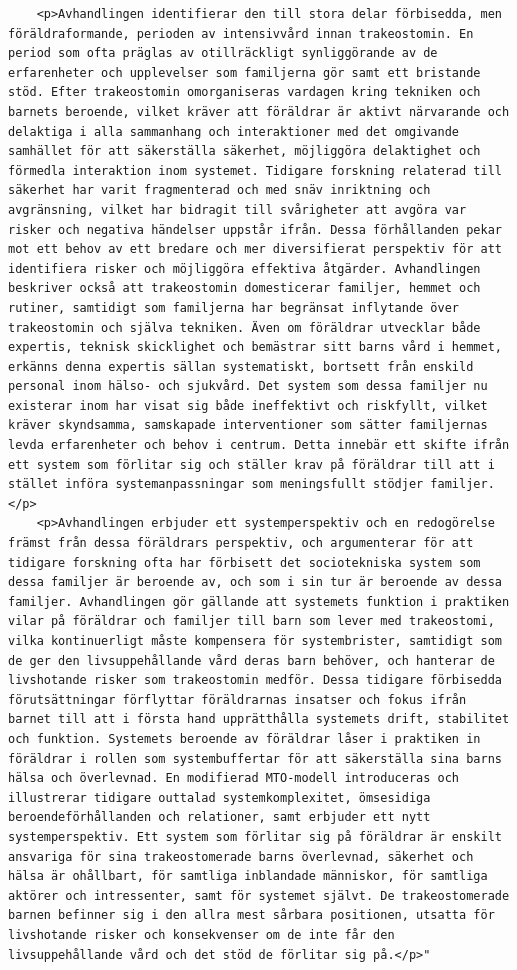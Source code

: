 \begin{casestudySection}
\begin{lstlisting}
    <p>Avhandlingen identifierar den till stora delar förbisedda, men föräldraformande, perioden av intensivvård innan trakeostomin. En period som ofta präglas av otillräckligt synliggörande av de erfarenheter och upplevelser som familjerna gör samt ett bristande stöd. Efter trakeostomin omorganiseras vardagen kring tekniken och barnets beroende, vilket kräver att föräldrar är aktivt närvarande och delaktiga i alla sammanhang och interaktioner med det omgivande samhället för att säkerställa säkerhet, möjliggöra delaktighet och förmedla interaktion inom systemet. Tidigare forskning relaterad till säkerhet har varit fragmenterad och med snäv inriktning och avgränsning, vilket har bidragit till svårigheter att avgöra var risker och negativa händelser uppstår ifrån. Dessa förhållanden pekar mot ett behov av ett bredare och mer diversifierat perspektiv för att identifiera risker och möjliggöra effektiva åtgärder. Avhandlingen beskriver också att trakeostomin domesticerar familjer, hemmet och rutiner, samtidigt som familjerna har begränsat inflytande över trakeostomin och själva tekniken. Även om föräldrar utvecklar både expertis, teknisk skicklighet och bemästrar sitt barns vård i hemmet, erkänns denna expertis sällan systematiskt, bortsett från enskild personal inom hälso- och sjukvård. Det system som dessa familjer nu existerar inom har visat sig både ineffektivt och riskfyllt, vilket kräver skyndsamma, samskapade interventioner som sätter familjernas levda erfarenheter och behov i centrum. Detta innebär ett skifte ifrån ett system som förlitar sig och ställer krav på föräldrar till att i stället införa systemanpassningar som meningsfullt stödjer familjer.</p>
    <p>Avhandlingen erbjuder ett systemperspektiv och en redogörelse främst från dessa föräldrars perspektiv, och argumenterar för att tidigare forskning ofta har förbisett det sociotekniska system som dessa familjer är beroende av, och som i sin tur är beroende av dessa familjer. Avhandlingen gör gällande att systemets funktion i praktiken vilar på föräldrar och familjer till barn som lever med trakeostomi, vilka kontinuerligt måste kompensera för systembrister, samtidigt som de ger den livsuppehållande vård deras barn behöver, och hanterar de livshotande risker som trakeostomin medför. Dessa tidigare förbisedda förutsättningar förflyttar föräldrarnas insatser och fokus ifrån barnet till att i första hand upprätthålla systemets drift, stabilitet och funktion. Systemets beroende av föräldrar låser i praktiken in föräldrar i rollen som systembuffertar för att säkerställa sina barns hälsa och överlevnad. En modifierad MTO‑modell introduceras och illustrerar tidigare outtalad systemkomplexitet, ömsesidiga beroendeförhållanden och relationer, samt erbjuder ett nytt systemperspektiv. Ett system som förlitar sig på föräldrar är enskilt ansvariga för sina trakeostomerade barns överlevnad, säkerhet och hälsa är ohållbart, för samtliga inblandade människor, för samtliga aktörer och intressenter, samt för systemet självt. De trakeostomerade barnen befinner sig i den allra mest sårbara positionen, utsatta för livshotande risker och konsekvenser om de inte får den livsuppehållande vård och det stöd de förlitar sig på.</p>"

\end{lstlisting}
\end{casestudySection}
